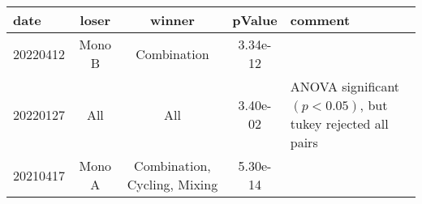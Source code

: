 \begin{tabular}{lcccp{5cm}}
\toprule
date & loser & winner & pValue & comment \\
\midrule
20220412 & Mono B & Combination & 3.34e-12 &  \\
20220127 & All & All & 3.40e-02 & ANOVA significant $(p<0.05)$, but tukey rejected all pairs \\
20210417 & Mono A & Combination, Cycling, Mixing & 5.30e-14 &  \\
\bottomrule
\end{tabular}
